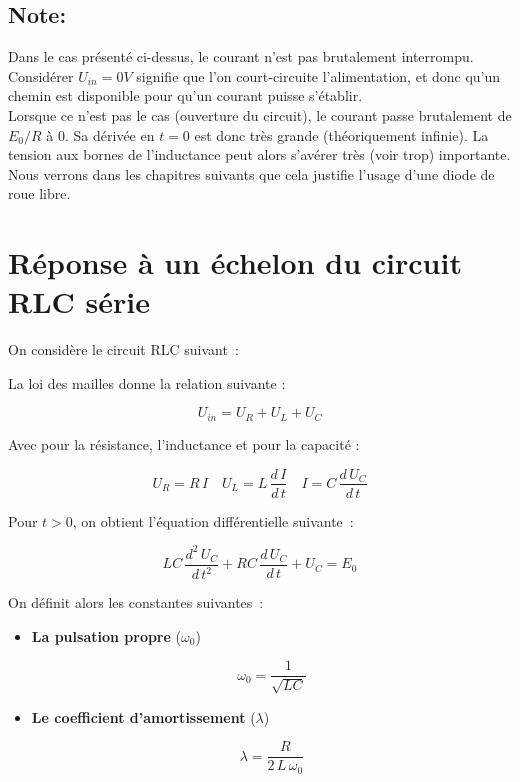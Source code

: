 \subsection*{Note:}

Dans le cas présenté ci-dessus, le courant n'est pas brutalement interrompu. Considérer $U_{in} = 0V$ signifie que l'on court-circuite l'alimentation, et donc qu'un chemin est disponible pour qu'un courant puisse s'établir. \\

Lorsque ce n'est pas le cas (ouverture du circuit), le courant passe brutalement de $E_0 / R$ à $0$. Sa dérivée en $t=0$ est donc très grande (théoriquement infinie). La tension aux bornes de l'inductance peut alors s'avérer très (voir trop) importante.  Nous verrons dans les chapitres suivants que cela justifie l'usage d'une diode de roue libre.\\

\section{Réponse à un échelon du circuit RLC série}

On considère le circuit RLC suivant~:

\begin{center}

\end{center}

La loi des mailles donne la relation suivante :

$$ U_{in} = U_R + U_L + U_C $$

Avec pour la résistance, l'inductance et pour la capacité :

$$ U_R = R\,I \quad U_L = L\,\dfrac{d\,I}{d\,t} \quad I = C \, \dfrac{d\,U_C}{d\,t}$$ 

Pour $t>0$, on obtient l'équation différentielle suivante~:

$$ LC\,\dfrac{d^{2}\,U_C}{d\,t^2} + RC\,\dfrac{d\,U_C}{d\,t} + U_C = E_0 $$

On définit alors les constantes suivantes~:\\

\begin{itemize}
\item \textbf{La pulsation propre} ($\omega_0$)

	$$ \omega_0 = \dfrac{1}{\sqrt{LC}} $$

\item \textbf{Le coefficient d'amortissement} ($\lambda$)

	$$ \lambda = \dfrac{R}{2\,L\,\omega_0} $$\\

\end{itemize}

